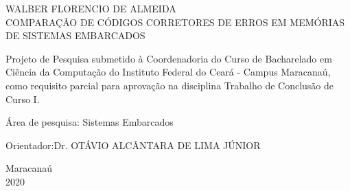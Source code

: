 \begin{titlepage}
\vfill
\begin{center}

    {\large WALBER FLORENCIO DE ALMEIDA\\}
    \vspace{2cm}
    {\Large \textsc{COMPARAÇÃO DE CÓDIGOS CORRETORES DE ERROS EM MEMÓRIAS DE SISTEMAS EMBARCADOS}\\}
    \vspace{1cm}
    \hspace{.45\linewidth}
    \begin{minipage}{.50\linewidth}

            Projeto de Pesquisa submetido à Coordenadoria do Curso de Bacharelado em Ciência da Computação do Instituto Federal do Ceará - Campus Maracanaú, como requisito 
            parcial para aprovação na disciplina Trabalho de Conclusão de Curso I.

            \vspace{0.5 cm}

            Área de pesquisa: Sistemas Embarcados

            \vspace{0.5 cm}

            Orientador:Dr. OTÁVIO ALCÂNTARA DE LIMA JÚNIOR 
    
    \end{minipage}

    \vspace{2cm}
    \vfill
    {\large Maracanaú\\ 2020}
\end{center}

\end{titlepage}